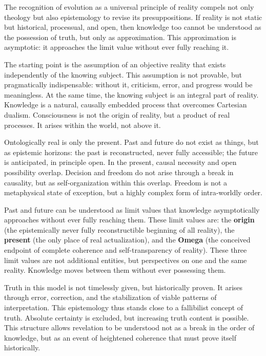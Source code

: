 \documentclass[
  english,
]{article}
\begin{document}
The recognition of evolution as a universal principle of reality compels
not only theology but also epistemology to revise its presuppositions.
If reality is not static but historical, processual, and open, then
knowledge too cannot be understood as the possession of truth, but only
as approximation. This approximation is asymptotic: it approaches the
limit value without ever fully reaching it.

The starting point is the assumption of an objective reality that exists
independently of the knowing subject. This assumption is not provable,
but pragmatically indispensable: without it, criticism, error, and
progress would be meaningless. At the same time, the knowing subject is
an integral part of reality. Knowledge is a natural, causally embedded
process that overcomes Cartesian dualism. Consciousness is not the
origin of reality, but a product of real processes. It arises within the
world, not above it.

Ontologically real is only the present. Past and future do not exist as
things, but as epistemic horizons: the past is reconstructed, never
fully accessible; the future is anticipated, in principle open. In the
present, causal necessity and open possibility overlap. Decision and
freedom do not arise through a break in causality, but as
self-organization within this overlap. Freedom is not a metaphysical
state of exception, but a highly complex form of intra-worldly order.

Past and future can be understood as limit values that knowledge
asymptotically approaches without ever fully reaching them. These limit
values are: the \textbf{origin} (the epistemically never fully
reconstructible beginning of all reality), the \textbf{present} (the
only place of real actualization), and the \textbf{Omega} (the conceived
endpoint of complete coherence and self-transparency of reality). These
three limit values are not additional entities, but perspectives on one
and the same reality. Knowledge moves between them without ever
possessing them.

Truth in this model is not timelessly given, but historically proven. It
arises through error, correction, and the stabilization of viable
patterns of interpretation. This epistemology thus stands close to a
fallibilist concept of truth. Absolute certainty is excluded, but
increasing truth content is possible. This structure allows revelation
to be understood not as a break in the order of knowledge, but as an
event of heightened coherence that must prove itself historically.
\end{document}
